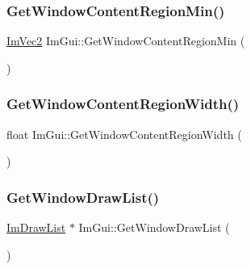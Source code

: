 \hypertarget{namespace_im_gui_a790123aa15c266798f35050ba36b7197}{}\label{namespace_im_gui_a790123aa15c266798f35050ba36b7197} 
\subsubsection{\texorpdfstring{Get\+Window\+Content\+Region\+Min()}{GetWindowContentRegionMin()}}
{\footnotesize\ttfamily \hyperlink{struct_im_vec2}{Im\+Vec2} Im\+Gui\+::\+Get\+Window\+Content\+Region\+Min (\begin{DoxyParamCaption}{ }\end{DoxyParamCaption})}

\hypertarget{namespace_im_gui_a87c1de99e670bff87c43bfb07bbf898f}{}\label{namespace_im_gui_a87c1de99e670bff87c43bfb07bbf898f} 
\subsubsection{\texorpdfstring{Get\+Window\+Content\+Region\+Width()}{GetWindowContentRegionWidth()}}
{\footnotesize\ttfamily float Im\+Gui\+::\+Get\+Window\+Content\+Region\+Width (\begin{DoxyParamCaption}{ }\end{DoxyParamCaption})}

\hypertarget{namespace_im_gui_aa100c22a9feafe843fa12c66590cbda0}{}\label{namespace_im_gui_aa100c22a9feafe843fa12c66590cbda0} 
\subsubsection{\texorpdfstring{Get\+Window\+Draw\+List()}{GetWindowDrawList()}}
{\footnotesize\ttfamily \hyperlink{struct_im_draw_list}{Im\+Draw\+List} $\ast$ Im\+Gui\+::\+Get\+Window\+Draw\+List (\begin{DoxyParamCaption}{ }\end{DoxyParamCaption})}

\hypertarget{namespace_im_gui_a3d01834c8e79d6256b319d5c19e06c1c}{}\label{namespace_im_gui_a3d01834c8e79d6256b319d5c19e06c1c} 

